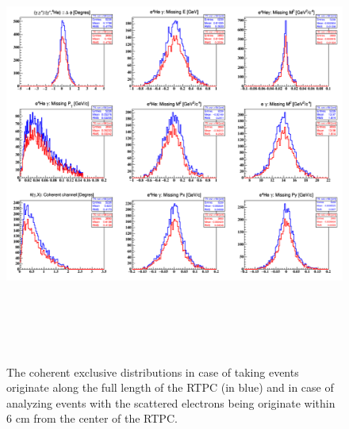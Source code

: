 \begin{figure}[h!]
\centering
\includegraphics[height=14.5cm]{fig/coh_exc_cuts_z.png}
\caption{The coherent exclusive distributions in case of taking events 
originate along the full length of the RTPC (in blue) and in case of analyzing 
events with the scattered electrons being originate within 6 cm from the center 
of the RTPC.}
\label{fig:coh_exc_cuts_z}
 \end{figure}


